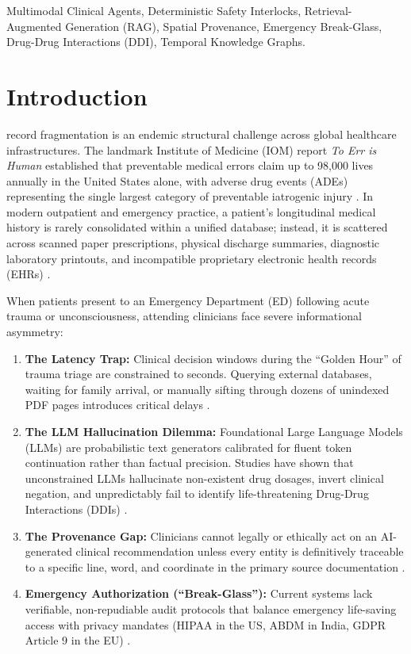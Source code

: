 \documentclass[journal]{IEEEtran}
\begin{document}
\begin{IEEEkeywords}
Multimodal Clinical Agents, Deterministic Safety Interlocks, Retrieval-Augmented Generation (RAG), Spatial Provenance, Emergency Break-Glass, Drug-Drug Interactions (DDI), Temporal Knowledge Graphs.
\end{IEEEkeywords}

\section{Introduction}
 record fragmentation is an endemic structural challenge across global healthcare infrastructures. The landmark Institute of Medicine (IOM) report \emph{To Err is Human} established that preventable medical errors claim up to 98,000 lives annually in the United States alone, with adverse drug events (ADEs) representing the single largest category of preventable iatrogenic injury \cite{kohn2000err}. In modern outpatient and emergency practice, a patient's longitudinal medical history is rarely consolidated within a unified database; instead, it is scattered across scanned paper prescriptions, physical discharge summaries, diagnostic laboratory printouts, and incompatible proprietary electronic health records (EHRs) \cite{menachemi2011benefits, rajpurkar2022ai}.

When patients present to an Emergency Department (ED) following acute trauma or unconsciousness, attending clinicians face severe informational asymmetry:
\begin{enumerate}
    \item \textbf{The Latency Trap:} Clinical decision windows during the ``Golden Hour'' of trauma triage are constrained to seconds. Querying external databases, waiting for family arrival, or manually sifting through dozens of unindexed PDF pages introduces critical delays \cite{cowley1982trauma}.
    \item \textbf{The LLM Hallucination Dilemma:} Foundational Large Language Models (LLMs) are probabilistic text generators calibrated for fluent token continuation rather than factual precision. Studies have shown that unconstrained LLMs hallucinate non-existent drug dosages, invert clinical negation, and unpredictably fail to identify life-threatening Drug-Drug Interactions (DDIs) \cite{adams2023cross, zakka2024almanac}.
    \item \textbf{The Provenance Gap:} Clinicians cannot legally or ethically act on an AI-generated clinical recommendation unless every entity is definitively traceable to a specific line, word, and coordinate in the primary source documentation \cite{amann2020explainability}.
    \item \textbf{Emergency Authorization (``Break-Glass''):} Current systems lack verifiable, non-repudiable audit protocols that balance emergency life-saving access with privacy mandates (HIPAA in the US, ABDM in India, GDPR Article 9 in the EU) \cite{ferreira2013breakglass}.
\end{enumerate}
\end{document}
